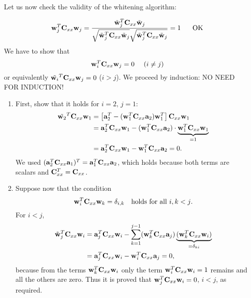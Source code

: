\begin{enumerate}
\begin{solution}
\begin{enumerate}
      Let us now check the validity of the whitening algorithm:

      \[
      \mathbf{w}_j^T\mathbf{C}_{xx}\mathbf{w}_j =\frac
      {\tilde{\mathbf{w}}_j^T\mathbf{C}_{xx}\tilde{\mathbf{w}}_j} {
        \sqrt{\tilde{\mathbf{w}}_j^T\mathbf{C}_{xx}\tilde{\mathbf{w}}_j}
        \sqrt{\tilde{\mathbf{w}}_j^T\mathbf{C}_{xx}\tilde{\mathbf{w}}_j} } =
      1 \hspace{6mm} \text{OK}
      \]
      We have to show that
      \begin{equation*}
        \mathbf{w}_i^T  \mathbf{C}_{xx} \mathbf{w}_j  = 0 \mbox{\ \ \ \ $(i \neq j)$}
      \end{equation*}
      or equivalently $\tilde{\mathbf{w}_i}^T \mathbf{C}_{xx} \mathbf{w}_j  = 0$ ($i > j$).
      We proceed by induction: NO NEED FOR INDUCTION!
      \begin{enumerate}
      \item First, show that it holds for $i=2, \, j=1$:
        \begin{align*}
          \tilde{\mathbf{w}_2}^T \mathbf{C}_{xx} \mathbf{w}_1 &= \left[
            \mathbf{a}_2^T - (\mathbf{w}_1^T \mathbf{C}_{xx}
            \mathbf{a}_2)\mathbf{w}_1^T \right] \mathbf{C}_{xx} \mathbf{w}_1
          \\
          &= \mathbf{a}_2^T \mathbf{C}_{xx} \mathbf{w}_1 - ( \mathbf{w}_1^T
          \mathbf{C}_{xx} \mathbf{a}_2 ) \cdot \underbrace{\mathbf{w}_1^T
            \mathbf{C}_{xx} \mathbf{w}_1}_{=1}
          \\
          &= \mathbf{a}_2^T \mathbf{C}_{xx} \mathbf{w}_1 - \mathbf{w}_1^T
          \mathbf{C}_{xx} \mathbf{a}_2 = 0 .
        \end{align*}
        We used $( \mathbf{a}_2^T \mathbf{C}_{xx} \mathbf{a}_1 )^T =
        \mathbf{a}_1^T \mathbf{C}_{xx} \mathbf{a}_2$, which holds because both
        terms are scalars and $\mathbf{C}_{xx}^T = \mathbf{C}_{xx}$.
      \item     
        Suppose now that the condition
        \begin{equation*}
          \mathbf{w}_i^T \mathbf{C}_{xx} \mathbf{w}_k = \delta_{i,k} \quad\text{holds for all $i,k < j$.}
        \end{equation*}
        For $i < j$,
        \begin{align*}
          \tilde{\mathbf{w}}_j^T \mathbf{C}_{xx} \mathbf{w}_i &=
          \mathbf{a}_j^T \mathbf{C}_{xx} \mathbf{w}_i - \sum_{k=1}^{j-1} (
          \mathbf{w}_k^T \mathbf{C}_{xx} \mathbf{a}_j ) \underbrace{(
            \mathbf{w}_k^T \mathbf{C}_{xx} \mathbf{w}_i )}_{=\delta_{ki}}
          \\
          &= \mathbf{a}_j^T \mathbf{C}_{xx} \mathbf{w}_i - \mathbf{w}_i^T
          \mathbf{C}_{xx} \mathbf{a}_j = 0,
        \end{align*}
        because from the terms $\mathbf{w}_k^T \mathbf{C}_{xx} \mathbf{w}_i$
        only the term $\mathbf{w}_i^T \mathbf{C}_{xx} \mathbf{w}_i = 1$
        remains and all the others are zero.  Thus it is proved that
        $\mathbf{w}_j^T \mathbf{C}_{xx} \mathbf{w}_i = 0$, $i < j$, as
        required.


\end{enumerate}
\end{enumerate}
\end{solution}
\end{enumerate}
